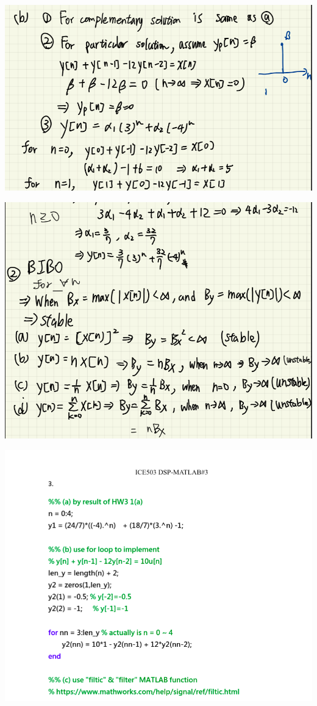\documentclass[a4paper]{article}
\begin{document}
	
	\begin{center}
		\includegraphics[width=1\linewidth]{screenshot022}
	\end{center}
	\begin{center}
		\includegraphics[width=1\linewidth]{screenshot023}
	\end{center}
	
	\begin{center}
		\includegraphics[width=1\linewidth]{screenshot024}
	\end{center}
	
\end{document}
